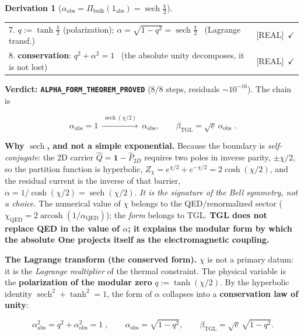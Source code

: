 \documentclass[11pt]{article}
\newcommand{\bTGL}{\beta_{\mathrm{TGL}}}\newcommand{\Msun}{M_{\odot}}\newcommand{\TGL}{\mathrm{TGL}}
\theoremstyle{definition}\newtheorem{deriv}{Derivation}
\begin{document}
\begin{deriv}[$\alpha_{\mathrm{obs}}=\Pi_{\mathrm{bulk}}(1_{\mathrm{abs}})=\operatorname{sech}\tfrac\chi2$]
\begin{center}
\begin{tabular}{p{} l}
7. $q:=\tanh\tfrac\chi2$ (polarization); $\alpha=\sqrt{1-q^2}=\operatorname{sech}\tfrac\chi2$ \ (Lagrange transf.) & \textsf{[REAL]}~$\checkmark$ \\

8. \textbf{conservation}: $q^2+\alpha^2=1$ \ (the absolute unity decomposes, it is not lost) & \textsf{[REAL]}~$\checkmark$ \\

\hline\end{tabular}\end{center}

\textbf{Verdict: \texttt{ALPHA\_FORM\_THEOREM\_PROVED}} (8/8 steps, residuals $\sim10^{-16}$). The chain is

\begin{equation}\boxed{\;\alpha_{\mathrm{abs}}=1\ \xrightarrow{\ \operatorname{sech}(\chi/2)\ }\ \alpha_{\mathrm{obs}},\qquad \bTGL=\sqrt e\,\alpha_{\mathrm{obs}}\;}.\end{equation}

\textbf{Why $\operatorname{sech}$, and not a simple exponential.} Because the boundary is \emph{self-conjugate}: the 2D carrier $\hat Q=\mathbf 1-\hat P_{2D}$ requires two poles in inverse parity, $\pm\chi/2$, so the partition function is hyperbolic, $Z_\chi=e^{\chi/2}+e^{-\chi/2}=2\cosh(\chi/2)$, and the residual current is the inverse of that barrier, $\alpha=1/\cosh(\chi/2)=\operatorname{sech}(\chi/2)$. \emph{It is the signature of the Bell symmetry, not a choice.} The numerical value of $\chi$ belongs to the QED/renormalized sector ($\chi_{\mathrm{QED}}=2\operatorname{arcosh}(1/\alpha_{\mathrm{QED}})$); the \emph{form} belongs to TGL. \textbf{TGL does not replace QED in the value of $\alpha$; it explains the modular form by which the absolute One projects itself as the electromagnetic coupling.}

\textbf{The Lagrange transform (the conserved form).} $\chi$ is not a primary datum: it is the \emph{Lagrange multiplier} of the thermal constraint. The physical variable is the \textbf{polarization of the modular zero} $q:=\tanh(\chi/2)$. By the hyperbolic identity $\operatorname{sech}^2+\tanh^2=1$, the form of $\alpha$ collapses into a \textbf{conservation law of unity}:

\begin{equation}\boxed{\;\alpha_{\mathrm{abs}}^2=q^2+\alpha_{\mathrm{obs}}^2=1\;},\qquad \alpha_{\mathrm{obs}}=\sqrt{1-q^2},\qquad \bTGL=\sqrt e\,\sqrt{1-q^2}.\end{equation}


\end{deriv}
\end{document}
